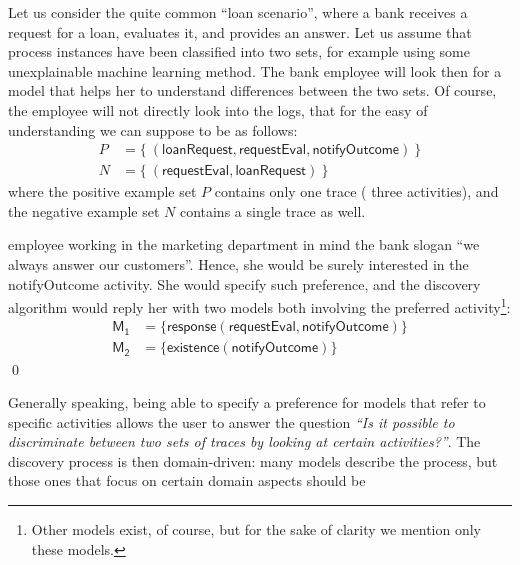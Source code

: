 \begin{example}
\label{ex:prefOverActivities}
Let us consider the quite common ``loan scenario'', where a bank receives a request for a loan, evaluates it, and provides an answer. Let us assume that process instances have been classified into two sets, for example using some unexplainable machine learning method. The bank employee will look then for a model that helps her to understand differences between the two sets. Of course, the employee will not directly look into the logs, that for the easy of understanding we can suppose to be as follows:
%
\begin{align*}
P & = \{\ (\mathsf{loanRequest}, \mathsf{requestEval}, \mathsf{notifyOutcome})\ \} \\
N & = \{\ (\mathsf{requestEval}, \mathsf{loanRequest})\ \}
\end{align*}
%
where the positive example set $P$ contains only one trace (
 three activities), and the negative example set $N$ contains a single trace as well.

\noindent {} 
 employee working in the marketing department 
 in mind the bank slogan ``we always answer our customers''. Hence, she would be surely interested in the \textsf{notifyOutcome} activity. She would specify such preference, and the discovery algorithm would reply her with two models both involving the preferred activity\footnote{Other models exist, of course, but for the sake of clarity we mention only these models.}:
%
\begin{align*}
\mathsf{M_1} & = \{ \mathsf{response(requestEval, notifyOutcome)}\} \\
\mathsf{M_2} & = \{ \mathsf{existence(notifyOutcome)}\}
\end{align*}
%
\qed
%
\end{example}

Generally speaking, being able to specify a preference for models that refer to specific activities allows the user to answer the question \emph{``Is it possible to discriminate between two sets of traces by looking at certain activities?''}. The discovery process is then domain-driven: many models describe the process, but those ones that focus on certain domain aspects should be  %





